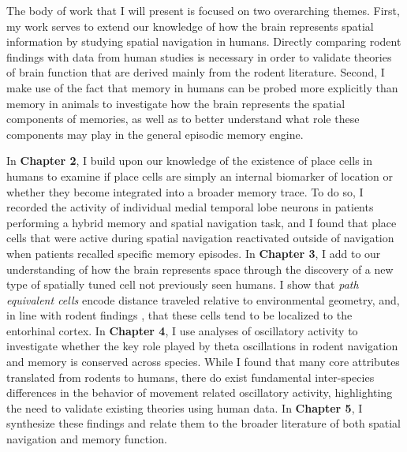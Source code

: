 The body of work that I will present is focused on two overarching themes. First, my work serves to extend our knowledge of how the brain represents spatial information by studying spatial navigation in humans. Directly comparing rodent findings with data from human studies is necessary in order to validate theories of brain function that are derived mainly from the rodent literature. Second, I make use of the fact that memory in humans can be probed more explicitly than memory in animals to investigate how the brain represents the spatial components of memories, as well as to better understand what role these components may play in the general episodic memory engine.

In \textbf{Chapter 2}, I build upon our knowledge of the existence of place cells in humans to examine if place cells are simply an internal biomarker of location or whether they become integrated into a broader memory trace. To do so, I recorded the activity of individual medial temporal lobe neurons in patients performing a hybrid memory and spatial navigation task, and I found that place cells that were active during spatial navigation reactivated outside of navigation when patients recalled specific memory episodes. In \textbf{Chapter 3}, I add to our understanding of how the brain represents space through the discovery of a new type of spatially tuned cell not previously seen humans. I show that \textit{path equivalent cells} encode distance traveled relative to environmental geometry, and, in line with rodent findings \citep{FranEtal00}, that these cells tend to be localized to the entorhinal cortex. In \textbf{Chapter 4}, I use analyses of oscillatory activity to investigate whether the key role played by theta oscillations in rodent navigation and memory is conserved across species. While I found that many core attributes translated from rodents to humans, there do exist fundamental inter-species differences in the behavior of movement related oscillatory activity, highlighting the need to validate existing theories using human data. In \textbf{Chapter 5}, I synthesize these findings and relate them to the broader literature of both spatial navigation and memory function.

% 

